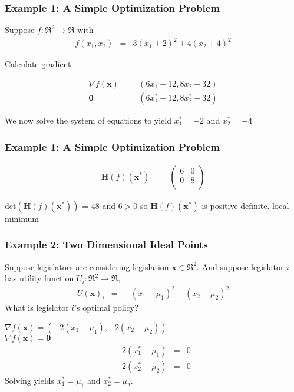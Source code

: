 \documentclass{beamer}
\numberwithin{equation}{section}
\begin{document}
\begin{frame}
\frametitle{Example 1: A Simple Optimization Problem}

Suppose $f:\Re^{2} \rightarrow \Re$ with 
\begin{eqnarray}
f(x_{1}, x_{2}) & = & 3(x_1 + 2)^2  + 4(x_{2}  + 4)^2 \nonumber 
\end{eqnarray}

Calculate gradient

\begin{eqnarray}
\nabla f(\boldsymbol{x}) & = & (6 x_{1} + 12 , 8x_{2} + 32 ) \nonumber \\
\boldsymbol{0} & = & (6 x_{1}^{*} + 12 , 8x_{2}^{*} + 32 ) \nonumber 
\end{eqnarray}

We now solve the system of equations to yield
$x_{1}^{*}  = - 2$ and $x_{2}^{*}  = -4 $ 




\end{frame}



\begin{frame}
\frametitle{Example 1: A Simple Optimization Problem}

\begin{eqnarray}
\textbf{H}(f)(\boldsymbol{x}^{*}) & = & \begin{pmatrix}
6 & 0 \\
0 & 8 \\
\end{pmatrix}\nonumber 
\end{eqnarray}

det$(\textbf{H}(f)(\boldsymbol{x}^{*}))$ = 48 and $6>0$ so $\textbf{H}(f)(\boldsymbol{x}^{*})$ is positive definite. \alert{local minimum}

\end{frame}







\begin{frame}
\frametitle{Example 2: Two Dimensional Ideal Points}
Suppose legislators are considering legislation $\boldsymbol{x} \in \Re^{2}$.  And suppose legislator $i$ has utility function $U_{i}: \Re^{2} \rightarrow \Re$, 
\begin{eqnarray}
U(\boldsymbol{x})_{i} & = & - (x_{1} - \mu_{1})^2 - (x_{2} - \mu_{2})^2 \nonumber 
\end{eqnarray}
What is legislator $i$'s \alert{optimal} policy?

$\nabla f(\boldsymbol{x}) = ( -2 (x_{1} - \mu_{1} ) , -2 (x_{2} - \mu_{2} )  )$\\
$\nabla f(\boldsymbol{x}) = \boldsymbol{0} $
\begin{eqnarray}
- 2(x_{1}^{*} - \mu_{1} ) & = & 0 \nonumber \\
- 2(x_{2}^{*} - \mu_{2} ) & = & 0 \nonumber 
\end{eqnarray} 
Solving yields $x_{1}^{*} = \mu_{1}$ and $x_{2}^{*} = \mu_{2}$.  


\end{frame}
\end{document}
